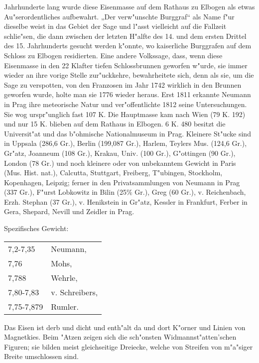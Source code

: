 \documentclass[a4paper, 11pt, oneside]{article}
\begin{document}
Jahrhunderte lang wurde diese Eisenmasse auf dem Rathaus zu Elbogen als etwas Au"serordentliches aufbewahrt. „Der verw"unschte Burggraf“ als Name f"ur dieselbe weist in das Gebiet der Sage und l"asst vielleicht auf die Fallzeit schlie"sen, die dann zwischen der letzten H"alfte des 14. und dem ersten Drittel des 15. Jahrhunderts gesucht werden k"onnte, wo kaiserliche Burggrafen auf dem Schloss zu Elbogen residierten. Eine andere Volkssage, dass, wenn diese Eisenmasse in den 22 Klafter tiefen Schlossbrunnen geworfen w"urde, sie immer wieder an ihre vorige Stelle zur"uckkehre, bewahrheitete sich, denn als sie, um die Sage zu verspotten, von den Franzosen im Jahr 1742 wirklich in den Brunnen geworfen wurde, holte man sie 1776 wieder heraus. Erst 1811 erkannte Neumann in Prag ihre meteorische Natur und ver"offentlichte 1812 seine Untersuchungen. Sie wog urspr"unglich fast 107 K. Die Hauptmasse kam nach Wien (79 K. 192) und nur 15 K. blieben auf dem Rathaus in Elbogen. 6 K. 480 besitzt die Universit"at und das b"ohmische Nationalmuseum in Prag. Kleinere St"ucke sind in Uppsala (286,6 Gr.), Berlin (199,087 Gr.), Harlem, Teylers Mus. (124,6 Gr.), Gr"atz, Joanneum (108 Gr.), Krakau, Univ. (100 Gr.), G"ottingen (90 Gr.), London (78 Gr.) und noch kleinere oder von unbekanntem Gewicht in Paris (Mus. Hist. nat.), Calcutta, Stuttgart, Freiberg, T"ubingen, Stockholm, Kopenhagen, Leipzig; ferner in den Privatsammlungen von Neumann in Prag (337 Gr.), F"urst Lobkowitz in Bilin (25\% Gr.), Greg (60 Gr.), v. Reichenbach, Erzh. Stephan (37 Gr.), v. Henikstein in Gr"atz, Kessler in Frankfurt, Ferber in Gera, Shepard, Nevill und Zeidler in Prag.

Spezifisches Gewicht:  
\begin{table}[!ht]
    \centering
    \begin{tabular}{l l}
        7,2-7,35 & Neumann,\\
        7,76 & Mohs,\\
        7,788 & Wehrle,\\
        7,80-7,83 & v. Schreibers,\\
        7,75-7,879 & Rumler.
    \end{tabular}
\end{table}

Das Eisen ist derb und dicht und enth"alt da und dort K"orner und Linien von Magnetkies. Beim "Atzen zeigen sich die sch"onsten Widmannst"atten'schen Figuren; sie bilden meist gleichseitige Dreiecke, welche von Streifen von m"a"siger Breite umschlossen sind.
\end{document}
